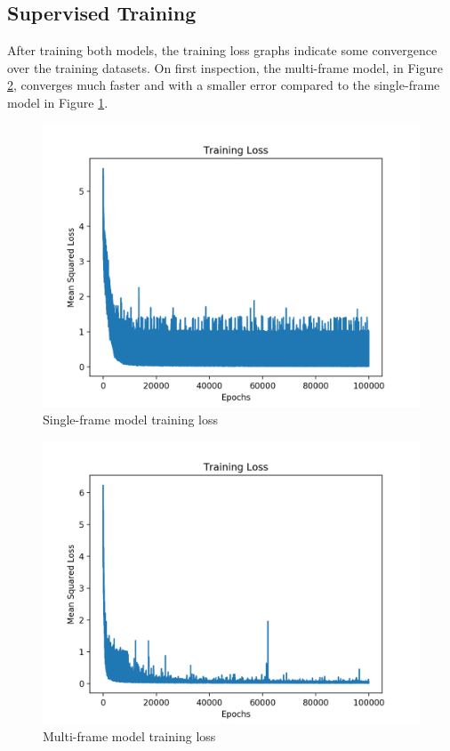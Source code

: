 \documentclass[conference]{IEEEtran}
\begin{document}
\subsection{Supervised Training}
After training both models, the training loss graphs indicate some convergence over the 
training datasets. On first inspection, the multi-frame model, in Figure \ref{fig:multi_loss},
converges much faster and with a smaller error compared to the single-frame model in Figure \ref{fig:single_loss}.
\begin{figure}[H]
  \centering
    \includegraphics[scale=0.28]{single_loss.png}
  \caption{Single-frame model training loss}
  \label{fig:single_loss}
\end{figure}
\begin{figure}[H]
  \centering
    \includegraphics[scale=0.28]{window_loss.png}
  \caption{Multi-frame model training loss}
  \label{fig:multi_loss}
\end{figure}
\end{document}

